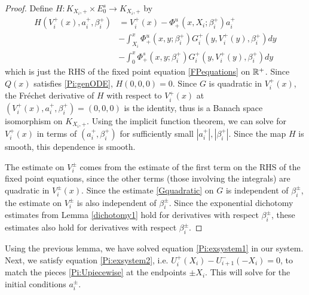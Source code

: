 \documentclass[thesis.tex]{subfiles}
\begin{document}
\begin{lemma}
\begin{proof}
Define $H: K_{X_i, +} \times E_0^s \rightarrow K_{X_i, +}$ by
\begin{align*}
H(V_i^+(x), a_i^+, \beta_i^+) &= V_i^+(x) - \Phi^u_+(x, X_i; \beta_i^+) a_i^+  \\
&- \int_{X_i}^x \Phi_+^u(x, y; \beta_i^+) G_i^+(y, V_i^+(y),\beta_i^+)dy \\
&- \int_0^x \Phi_+^s(x, y; \beta_i^+) G_i^+(y, V_i^+(y),\beta_i^+)dy 
\end{align*}
which is just the RHS of the fixed point equation \eqref{FPequations} on ${\mathbb R}^+$. Since $Q(x)$ satisfies \eqref{Pi:genODE}, $H(0, 0, 0) = 0$. Since $G$ is quadratic in $V_i^+(x)$, the Fr\'echet derivative of $H$ with respect to $V_i^+(x)$ at $(V_i^+(x), a_i^+, \beta_i^+) = (0, 0, 0)$ is the identity, thus is a Banach space isomorphism on $K_{X_i, +}$. Using the implicit function theorem, we can solve for $V_i^+(x)$ in terms of $(a_i^+, \beta_i^+)$ for sufficiently small $|a_i^+|, |\beta_i^+|$. Since the map $H$ is smooth, this dependence is smooth.

The estimate on $V_i^\pm$ comes from the estimate of the first term on the RHS of the fixed point equations, since the other terms (those involving the integrals) are quadratic in $V_i^\pm(x)$. Since the estimate \eqref{Gquadratic} on $G$ is independent of $\beta_i^\pm$, the estimate on {}$V_i^\pm$ is also independent of $\beta_i^\pm$. Since the exponential dichotomy estimates from Lemma \ref{dichotomy1} hold for derivatives with respect $\beta_i^\pm$, these estimates also hold for derivatives with respect $\beta_i^\pm$.
\end{proof}
\end{lemma}

Using the previous lemma, we have solved equation \eqref{Pi:exsystem1} in our system. Next, we satisfy equation \eqref{Pi:exsystem2}, i.e. $U_i^+(X_i) - U_{i+1}^-(-X_i) = 0$, to match the pieces \eqref{Pi:Upiecewise} at the endpoints $\pm X_i$. This will solve for the initial conditions $a_i^\pm$.

\end{document}
